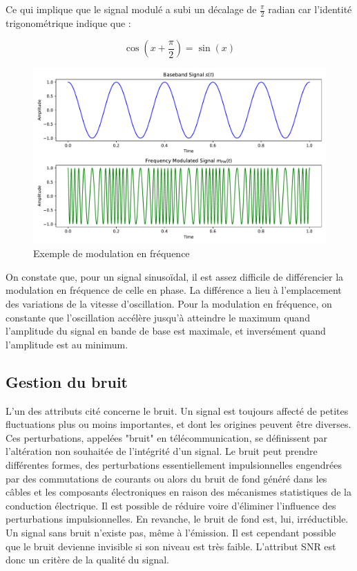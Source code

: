 Ce qui implique que le signal modulé a subi un décalage de $\frac{\pi}{2}$ radian car l'identité trigonométrique indique que :

\begin{equation}\label{eq122}
\cos(x+\frac{\pi}{2}) = \sin(x)
\end{equation}

\begin{figure}[h]
\centering

\includegraphics[scale=0.5]{images/FM_MOD.pdf}
\caption{Exemple de modulation en fréquence}\label{term2}
\end{figure}



On constate que, pour un signal sinusoïdal, il est assez difficile de différencier la modulation en fréquence de celle en phase. La différence a lieu à l'emplacement des variations de la vitesse d'oscillation. Pour la modulation en fréquence, on constante que l'oscillation accélère jusqu'à atteindre le maximum quand l'amplitude du signal en bande de base est maximale, et inversément quand l'amplitude est au minimum.


\subsection{Gestion du bruit}

L'un des attributs cité concerne le bruit. Un signal est toujours affecté de petites fluctuations plus ou moins importantes, et dont les origines peuvent être diverses. Ces perturbations, appelées "bruit" en télécommunication, se définissent par l'altération non souhaitée de l'intégrité d'un signal. Le bruit peut prendre différentes formes, des perturbations essentiellement impulsionnelles engendrées par des commutations de courants ou alors du bruit de fond généré dans les câbles et les composants électroniques en raison
des mécanismes statistiques de la conduction électrique. Il est possible de réduire voire d'éliminer l'influence des perturbations impulsionnelles. En revanche, le bruit de fond est, lui, irréductible. Un signal sans bruit n'existe pas, même à l'émission. Il est cependant possible que le bruit devienne invisible si son niveau est très faible. L'attribut \ac{SNR} est donc un critère de la qualité du signal.


